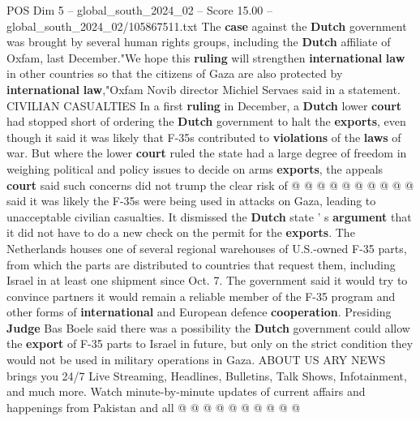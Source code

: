 \begin{textsample}{POS Dim 5 – global\_south\_2024\_02 – Score 15.00 – global\_south\_2024\_02/105867511.txt}
The \textbf{case} against the \textbf{Dutch} government was brought by several human rights groups, including the \textbf{Dutch} affiliate of Oxfam, last December."We hope this \textbf{ruling} will strengthen \textbf{international} \textbf{law} in other countries so that the citizens of Gaza are also protected by \textbf{international} \textbf{law},"Oxfam Novib director Michiel Servaes said in a statement.
CIVILIAN CASUALTIES In a first \textbf{ruling} in December, a \textbf{Dutch} lower \textbf{court} had stopped short of ordering the \textbf{Dutch} government to halt the \textbf{exports}, even though it said it was likely that F-35s contributed to \textbf{violations} of the \textbf{laws} of war.
But where the lower \textbf{court} ruled the state had a large degree of freedom in weighing political and policy issues to decide on arms \textbf{exports}, the appeals \textbf{court} said such concerns did not trump the clear risk of @ @ @ @ @ @ @ @ @ @ said it was likely the F-35s were being used in attacks on Gaza, leading to unacceptable civilian casualties.
It dismissed the \textbf{Dutch} state ' s \textbf{argument} that it did not have to do a new check on the permit for the \textbf{exports}.
The Netherlands houses one of several regional warehouses of U.S.-owned F-35 parts, from which the parts are distributed to countries that request them, including Israel in at least one shipment since Oct. 7.
The government said it would try to convince partners it would remain a reliable member of the F-35 program and other forms of \textbf{international} and European defence \textbf{cooperation}.
Presiding \textbf{Judge} Bas Boele said there was a possibility the \textbf{Dutch} government could allow the \textbf{export} of F-35 parts to Israel in future, but only on the strict condition they would not be used in military operations in Gaza.
ABOUT US ARY NEWS brings you 24/7 Live Streaming, Headlines, Bulletins, Talk Shows, Infotainment, and much more.
Watch minute-by-minute updates of current affairs and happenings from Pakistan and all @ @ @ @ @ @ @ @ @ @

\end{textsample}
